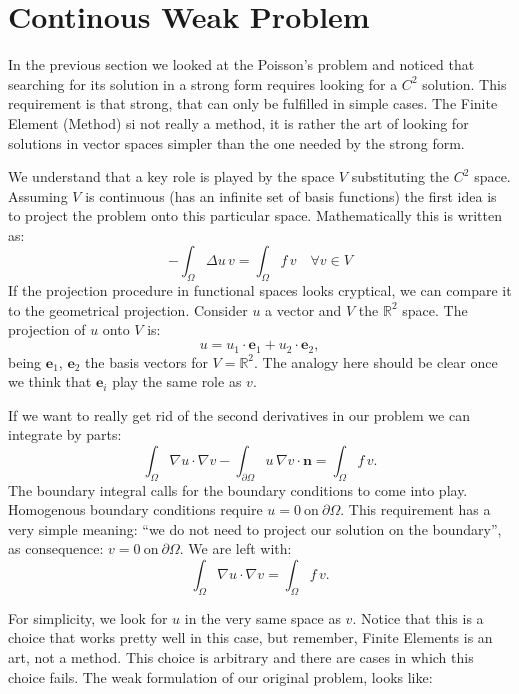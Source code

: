 \documentclass[11pt]{amsart}
\begin{document}
\section{Continous Weak Problem}
In the previous section we looked at the Poisson's problem and noticed that searching 
for its solution in a strong form requires looking for a $C^2$ solution. This requirement 
is that strong, that can only be fulfilled in simple cases. 
The Finite Element (Method) si not really a method, it is rather the art of looking 
for solutions in vector spaces simpler than the one needed by the strong form.

We understand that a key role is played by the space $V$ substituting 
the $C^2$ space. Assuming $V$ is continuous (has an infinite set of basis 
functions) the first idea is to project the problem onto this particular space. 
Mathematically this is written as:
\[
-\int_\Omega \Delta u\, v = \int_\Omega f\, v \quad \forall v \in V
\]
If the projection procedure in functional spaces looks cryptical,
we can compare it to the geometrical projection. Consider $u$ a vector 
and $V$ the $\mathbb{R}^2$ space. The projection of $u$ onto $V$ is:
\[
u = u_1 \cdot \mathbf{e}_1 + u_2 \cdot \mathbf{e}_2,
\]
being $\mathbf{e}_1$, $\mathbf{e}_2$ the basis vectors for $V = \mathbb{R}^2$.
The analogy here should be clear once we think that $\mathbf{e}_i$ play the 
same role as $v$.  

If we want to really get rid of the second derivatives in our problem we can 
integrate by parts:
\[
\int_\Omega \nabla u \cdot \nabla v - 
\int_{\partial \Omega} u \,\nabla v \cdot \mathbf{n} = \int_\Omega f\, v.
\]
The boundary integral calls for the boundary conditions to come into play. 
Homogenous boundary conditions require $u=0\ \mathrm{on}\ \partial\Omega$.
This requirement has a very simple meaning: ``we do not need to project our solution
on the boundary'', as consequence: $v=0\ \mathrm{on}\ \partial\Omega$.
We are left with:
\[
\int_\Omega \nabla u \cdot \nabla v = \int_\Omega f\, v.
\]

For simplicity, we look for $u$ in the very same space as $v$. 
Notice that this is a choice that works pretty well in this case, but
remember, Finite Elements is an art, not a method. This choice 
is arbitrary and there are cases in which this choice fails. 
The weak formulation 
of our original problem, looks like:
\end{document}
